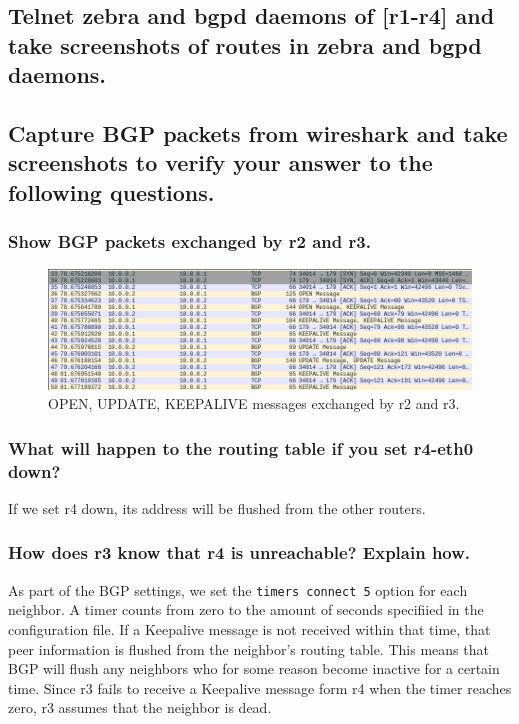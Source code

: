\documentclass{article}
\begin{document}
\subsection{Telnet zebra and bgpd daemons of [r1-r4] and take screenshots of routes in zebra
and bgpd daemons.}

\subsection{Capture BGP packets from wireshark and take screenshots to verify your answer
to the following questions.}


\subsubsection{Show BGP packets exchanged by r2 and r3.}

\begin{figure}
	\label{fig:BGPMessages}
	\includegraphics[scale=0.3]{3BGPMessages.png}
	\caption{OPEN, UPDATE, KEEPALIVE messages exchanged by r2 and r3.}
\end{figure}

\subsubsection{What will happen to the routing table if you set r4-eth0 down?}
If we set r4 down, its address will be flushed from the other routers.

\subsubsection{How does r3 know that r4 is unreachable? Explain how.}
As part of the BGP settings, we set the \texttt{timers connect 5} option for each neighbor.
A timer counts from zero to the amount of seconds specifiied in the configuration file.
If a Keepalive message is not received within that time, that peer information is flushed
from the neighbor's routing table.
This means that BGP will flush any neighbors who for some reason become inactive for 
a certain time.
Since r3 fails to receive a Keepalive message form r4 when the timer reaches zero, 
r3 assumes that the neighbor is dead.
\end{document}
